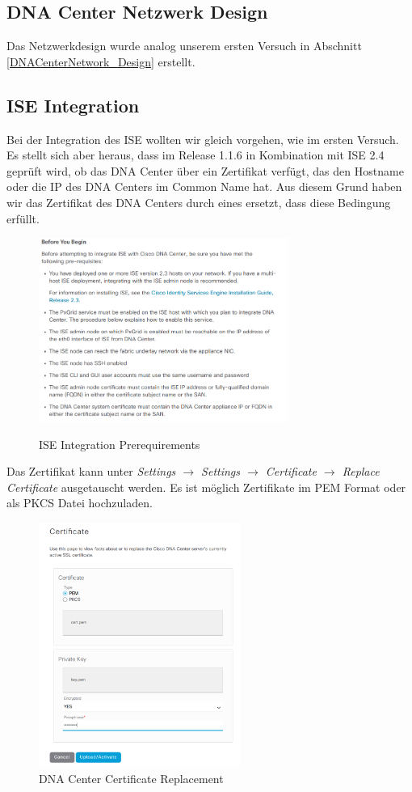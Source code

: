 \subsection{DNA Center Netzwerk Design}
Das Netzwerkdesign wurde analog unserem ersten Versuch in Abschnitt \ref{DNACenterNetwork_Design} erstellt.


\subsection{ISE Integration}
Bei der Integration des ISE wollten wir gleich vorgehen, wie im ersten Versuch. Es stellt sich aber heraus, dass im Release 1.1.6 in Kombination mit ISE 2.4 geprüft wird, ob das DNA Center über ein Zertifikat verfügt, das den Hostname oder die IP des DNA Centers im Common Name hat. Aus diesem Grund haben wir das Zertifikat des DNA Centers durch eines ersetzt, dass diese Bedingung erfüllt.

\begin{figure}[H]
	\centering
	\includegraphics[height=6cm]{img/secondtry/ise-prerequirements.png}
	\caption{ISE Integration Prerequirements}
	\label{fig:dna-ise-prerequirements}
	\cite{cisco-dna-installation-guide}
\end{figure}

Das Zertifikat kann unter \textit{Settings $\rightarrow$ Settings $\rightarrow$ Certificate $\rightarrow$ Replace Certificate} ausgetauscht werden. Es ist möglich Zertifikate im PEM Format oder als PKCS Datei hochzuladen. 

\begin{figure}[H]
	\centering
	\includegraphics[height=8cm]{img/secondtry/dna-center-certificate-replacement.png}
	\caption{DNA Center Certificate Replacement}
	\label{fig:dna-certificate-replacement}
\end{figure}

